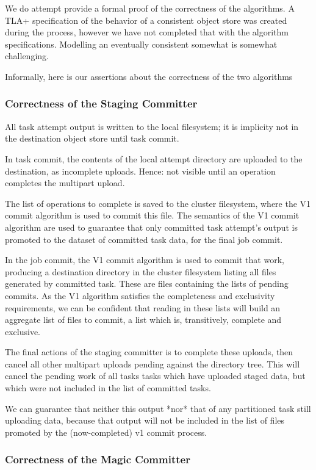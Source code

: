 \documentclass[conference]{IEEEtran}
\begin{document}
We do attempt provide a formal proof of the correctness of the algorithms.
A TLA+ specification of the behavior of a consistent object store was created
during the process, however we have not completed that with the algorithm specifications.
Modelling an eventually consistent somewhat is somewhat challenging.

Informally, here is our assertions about the correctness of the two algorithms

\subsubsection{Correctness of the Staging Committer}

All task attempt output is written to the local filesystem;
it is implicity not in the destination object store until task commit.

In task commit, the contents of the local attempt directory are uploaded to the
destination, as incomplete uploads.
Hence: not visible until an operation completes the multipart upload.

The list of operations to complete is saved to the cluster filesystem, where
the V1 commit algorithm is used to commit this file.
The semantics of the V1 commit algorithm are used to guarantee that only
committed task attempt's output is promoted to the dataset of committed task
data, for the final job commit.

In the job commit, the V1 commit algorithm is used to commit that work, producing
a destination directory in the cluster filesystem listing all files generated
by committed task.
These are files containing the lists of pending commits.
As the V1 algorithm satisfies the completeness and exclusivity requirements,
we can be confident that reading in these lists will build an aggregate list
of files to commit, a list which is, transitively, complete and exclusive.

The final actions of the staging committer is to complete these uploads,
then cancel all other multipart uploads pending against the directory tree.
This will cancel the pending work of all tasks tasks which have uploaded staged
data, but which were not included in the list of committed tasks.

We can guarantee that neither this output *nor* that of any partitioned
task still uploading data, because that output will not be included in the
list of files promoted by the (now-completed) v1 commit process.

\subsubsection{Correctness of the Magic Committer}
\end{document}
